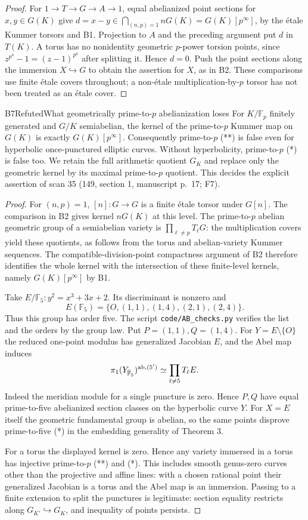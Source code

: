 \begin{proof}
For $1\to T\to G\to A\to1$, equal abelianized point sections for
$x,y\in G(K)$ give
$d=x-y\in\bigcap_{(n,p)=1}nG(K)=G(K)[p^\infty]$, by the \'etale
Kummer torsors and B1. Projection to $A$ and the preceding argument
put $d$ in $T(K)$. A torus has no nonidentity geometric $p$-power
 torsion points, since $z^{p^a}-1=(z-1)^{p^a}$ after splitting it.
Hence $d=0$. Push the point sections along the immersion $X\hookrightarrow G$
to obtain the assertion for $X$, as in B2. These comparisons use finite
\'etale covers throughout; a non-\'etale multiplication-by-$p$ torsor
has not been treated as an \'etale cover.
\end{proof}

\begin{result}{B7}{Refuted}{What geometrically prime-to-$p$ abelianization loses}
\label{res:B7}
For $K/\mathbb F_p$ finitely generated and $G/K$ semiabelian, the kernel
of the prime-to-$p$ Kummer map on $G(K)$ is exactly $G(K)[p^\infty]$.
Consequently prime-to-$p$ (**) is false even for hyperbolic
once-punctured elliptic curves. Without hyperbolicity, prime-to-$p$ (*)
is false too. We retain the full arithmetic quotient $G_K$ and replace
only the geometric kernel by its maximal prime-to-$p$ quotient.
This decides the explicit assertion of scan 35 (149, section 1,
manuscript p.~17; F7).
\end{result}
\begin{proof}
For $(n,p)=1$, $[n]:G\to G$ is a finite \'etale torsor under $G[n]$.
The comparison in B2 gives kernel $nG(K)$ at this level. The
prime-to-$p$ abelian geometric group of a semiabelian variety is
$\prod_{\ell\ne p}T_\ell G$: the multiplication covers yield these
quotients, as follows from the torus and abelian-variety Kummer
sequences. The compatible-division-point compactness argument of B2
therefore identifies the whole kernel with the intersection of these
finite-level kernels, namely $G(K)[p^\infty]$ by B1.

Take $E/\mathbb F_5:y^2=x^3+3x+2$. Its discriminant is nonzero and
\[
 E(\mathbb F_5)=\{O,(1,1),(1,4),(2,1),(2,4)\}.
\]
Thus this group has order five. The script \texttt{code/AB\_checks.py}
verifies the list and the orders by the group law. Put
$P=(1,1),Q=(1,4)$. For $Y=E\setminus\{O\}$ the reduced one-point
modulus has generalized Jacobian $E$, and the Abel map induces
\[
 \pi_1(Y_{\overline{\mathbb F}_5})^{\rm ab,(5')}
       \simeq\prod_{\ell\ne5}T_\ell E.
\]
Indeed the meridian module for a single puncture is zero. Hence
$P,Q$ have equal prime-to-five abelianized section classes on the
hyperbolic curve $Y$. For $X=E$ itself the geometric fundamental
group is abelian, so the same points disprove prime-to-five (*) in
the embedding generality of Theorem 3.

For a torus the displayed kernel is zero. Hence any variety immersed
in a torus has injective prime-to-$p$ (**) and (*). This includes
smooth genus-zero curves other than the projective and affine lines:
with a chosen rational point their generalized Jacobian is a torus
and the Abel map is an immersion. Passing to a finite extension to
split the punctures is legitimate: section equality restricts along
$G_{K'}\hookrightarrow G_K$, and inequality of points persists.
\end{proof}

